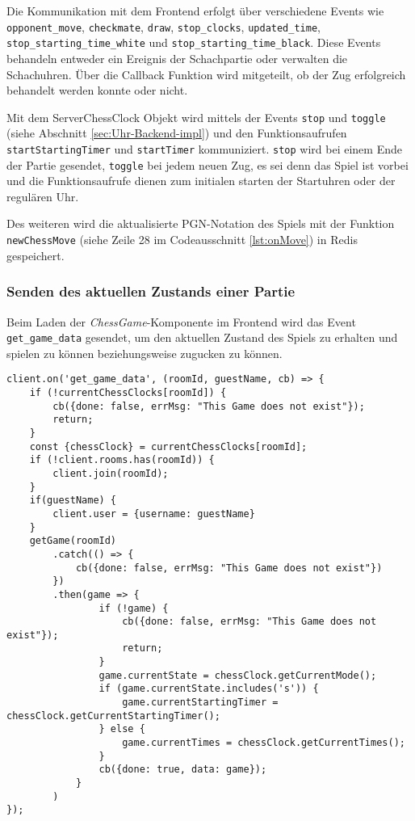 Die Kommunikation mit dem Frontend erfolgt über verschiedene Events wie \linebreak \verb|opponent_move|, \verb|checkmate|, \verb|draw|, \verb|stop_clocks|, \verb|updated_time|,  \linebreak \verb|stop_starting_time_white| und \verb|stop_starting_time_black|. Diese Events behandeln entweder ein Ereignis der Schachpartie oder verwalten die Schachuhren. Über die Callback Funktion wird mitgeteilt, ob der Zug erfolgreich behandelt werden konnte oder nicht.

Mit dem ServerChessClock Objekt wird mittels der Events \verb|stop| und \verb|toggle| (siehe Abschnitt \ref{sec:Uhr-Backend-impl}) und den Funktionsaufrufen \verb|startStartingTimer| und \verb|startTimer| kommuniziert. \verb|stop| wird bei einem Ende der Partie gesendet, \verb|toggle| bei jedem neuen Zug, es sei denn das Spiel ist vorbei und die Funktionsaufrufe dienen zum initialen starten der Startuhren oder der regulären Uhr.

Des weiteren wird die aktualisierte PGN-Notation des Spiels mit der Funktion \linebreak \verb|newChessMove| (siehe Zeile 28 im Codeausschnitt \ref{lst:onMove}) in Redis gespeichert.

\subsubsection{Senden des aktuellen Zustands einer Partie}
Beim Laden der \textit{ChessGame}-Komponente im Frontend wird das Event \verb|get_game_data| gesendet, um den aktuellen Zustand des Spiels zu erhalten und spielen zu können beziehungsweise zugucken zu können. 


\begin{lstlisting}[style=codeStyle, caption={Der Listener des get\_game\_data Events zum übermitteln des Schachspiels}, label={lst:get_game_data}]
client.on('get_game_data', (roomId, guestName, cb) => {
    if (!currentChessClocks[roomId]) {
        cb({done: false, errMsg: "This Game does not exist"});
        return;
    }
    const {chessClock} = currentChessClocks[roomId];
    if (!client.rooms.has(roomId)) {
        client.join(roomId);
    }
    if(guestName) {
        client.user = {username: guestName}
    }
    getGame(roomId)
        .catch(() => {
            cb({done: false, errMsg: "This Game does not exist"})
        })
        .then(game => {
                if (!game) {
                    cb({done: false, errMsg: "This Game does not exist"});
                    return;
                }
                game.currentState = chessClock.getCurrentMode();
                if (game.currentState.includes('s')) {
                    game.currentStartingTimer = chessClock.getCurrentStartingTimer();
                } else {
                    game.currentTimes = chessClock.getCurrentTimes();
                }
                cb({done: true, data: game});
            }
        )
});
\end{lstlisting}

